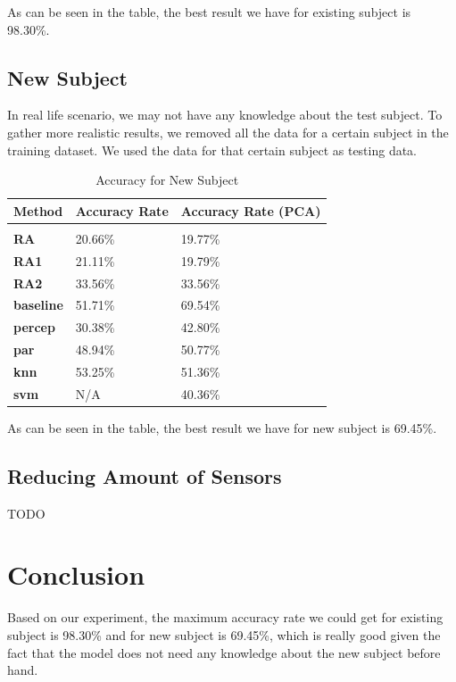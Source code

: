\documentclass{article} %
\begin{document}
As can be seen in the table, the best result we have for existing subject is 98.30\%.


\subsection{New Subject}

In real life scenario, we may not have any knowledge about the test subject. To gather more realistic results, we removed all the data for a certain subject in the training dataset. We used the data for that certain subject as testing data.  

\begin{table}[H]
\caption{Accuracy for New Subject}
\begin{center}
\begin{tabular}{lll}
{\bf Method} & {\bf Accuracy Rate} & {\bf Accuracy Rate (PCA)} \\
\hline \\
{\bf RA}       & 20.66\% & 19.77\% \\
{\bf RA1}      & 21.11\% & 19.79\% \\
{\bf RA2}      & 33.56\% & 33.56\% \\
{\bf baseline} & 51.71\% & 69.54\% \\
{\bf percep}   & 30.38\% & 42.80\% \\
{\bf par}      & 48.94\% & 50.77\% \\
{\bf knn}      & 53.25\% & 51.36\% \\
{\bf svm}      & N/A     & 40.36\% \\
\end{tabular}
\end{center}
\end{table}

As can be seen in the table, the best result we have for new subject is 69.45\%.

\subsection{Reducing Amount of Sensors}

TODO

\section{Conclusion}

Based on our experiment, the maximum accuracy rate we could get for existing subject is 98.30\% and for new subject is 69.45\%, which is really good given the fact that the model does not need any knowledge about the new subject before hand.
\end{document}
